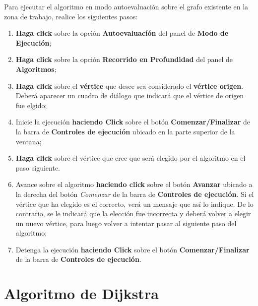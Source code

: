 \documentclass{book}
\begin{document}
Para ejecutar el algoritmo en modo autoevaluación sobre el grafo existente en la zona de trabajo, realice los siguientes pasos:
\medskip

\begin{enumerate}
	\itemsep=8pt \topsep=0pt \partopsep=0pt \parskip=0pt \parsep=0pt

	\item \textbf{Haga click} sobre la opción \textbf{Autoevaluacíón} del panel de \textbf{Modo de Ejecución};

	\item \textbf{Haga click} sobre la opción \textbf{Recorrido en Profundidad} del panel de \textbf{Algoritmos};

	\item \textbf{Haga click} sobre el \textbf{vértice} que desee sea considerado el \textbf{vértice origen}. Deberá aparecer un cuadro de diálogo que indicará que el vértice de origen fue elgido;

	\item Inicie la ejecución \textbf{haciendo Click} sobre el botón \textbf{Comenzar/Finalizar} de la barra de \textbf{Controles de ejecución} ubicado en la parte superior de la ventana;

	\item \textbf{Haga click} sobre el vértice que cree que será elegido por el algoritmo en el paso siguiente.

	\item Avance sobre el algoritmo \textbf{haciendo click} sobre el botón \textbf{Avanzar} ubicado a la derecha del botón \textit{Comenzar} de la barra de \textbf{Controles de ejecución}. Si el vértice que ha elegido es el correcto, verá un mensaje que así lo indique. De lo contrario, se le indicará que la elección fue incorrecta y deberá volver a elegir un nuevo vértice, para luego volver a intentar pasar al siguiente paso del algoritmo;

	\item Detenga la ejecución \textbf{haciendo Click} sobre el botón \textbf{Comenzar/Finalizar} de la barra de \textbf{Controles de ejecución}.

\end{enumerate}
\medskip





%
%
\chapter{Algoritmo de Dijkstra}
\end{document}
